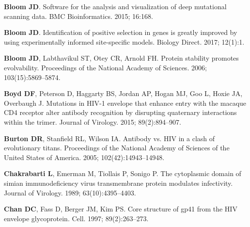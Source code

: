\documentclass[9pt]{elife}
\begin{document}
\begin{thebibliography}{114}
\textbf{\color{eLifeMediumGrey} Bloom JD}.
\newblock Software for the analysis and visualization of deep mutational
  scanning data.
\newblock BMC Bioinformatics.  2015; 16:168.

\textbf{\color{eLifeMediumGrey} Bloom JD}.
\newblock Identification of positive selection in genes is greatly improved by
  using experimentally informed site-specific models.
\newblock Biology Direct.  2017; 12(1):1.

\textbf{\color{eLifeMediumGrey} Bloom JD}, Labthavikul ST, Otey CR, Arnold FH.
\newblock Protein stability promotes evolvability.
\newblock Proceedings of the National Academy of Sciences.  2006;
  103(15):5869--5874.

\textbf{\color{eLifeMediumGrey} Boyd DF}, Peterson D, Haggarty BS, Jordan AP,
  Hogan MJ, Goo L, Hoxie JA, Overbaugh J.
\newblock Mutations in HIV-1 envelope that enhance entry with the macaque CD4
  receptor alter antibody recognition by disrupting quaternary interactions
  within the trimer.
\newblock Journal of Virology.  2015; 89(2):894--907.

\textbf{\color{eLifeMediumGrey} Burton DR}, Stanfield RL, Wilson IA.
\newblock Antibody vs. HIV in a clash of evolutionary titans.
\newblock Proceedings of the National Academy of Sciences of the United States
  of America.  2005; 102(42):14943--14948.

\textbf{\color{eLifeMediumGrey} Chakrabarti L}, Emerman M, Tiollais P, Sonigo
  P.
\newblock The cytoplasmic domain of simian immunodeficiency virus transmembrane
  protein modulates infectivity.
\newblock Journal of Virology.  1989; 63(10):4395--4403.

\textbf{\color{eLifeMediumGrey} Chan DC}, Fass D, Berger JM, Kim PS.
\newblock Core structure of gp41 from the HIV envelope glycoprotein.
\newblock Cell.  1997; 89(2):263--273.


\end{thebibliography}
\end{document}
